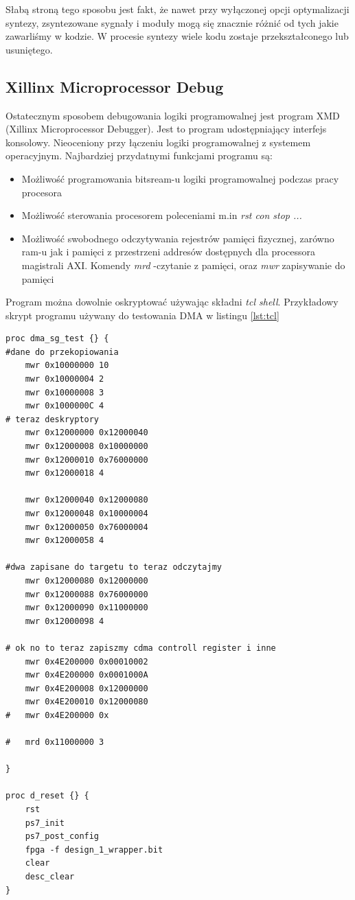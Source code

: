 Słabą stroną tego sposobu jest fakt, że nawet przy wyłączonej opcji optymalizacji
syntezy, zsyntezowane sygnały i moduły mogą się znacznie różnić od tych jakie
zawarliśmy w kodzie. W procesie syntezy wiele kodu zostaje przekształconego lub
usuniętego.

\subsection{Xillinx Microprocessor Debug}
\label{sec:logika:debug:cmd}

Ostatecznym sposobem debugowania logiki programowalnej jest program XMD
(Xillinx Microprocessor Debugger). Jest to program udostępniający interfejs
konsolowy. Nieoceniony przy łączeniu logiki programowalnej z systemem operacyjnym.
Najbardziej przydatnymi funkcjami programu są:
\begin{itemize}
\item Możliwość programowania bitsream-u logiki programowalnej podczas pracy procesora
\item Możliwość sterowania procesorem poleceniami m.in \textit{rst con stop ...}
\item Możliwość swobodnego odczytywania rejestrów pamięci fizycznej, zarówno ram-u
jak i pamięci z przestrzeni addresów dostępnych dla processora magistrali AXI.
Komendy \textit{mrd} -czytanie z pamięci, oraz \textit{mwr} zapisywanie do pamięci
\end{itemize}

Program można dowolnie oskryptować używając składni \textit{tcl shell}.
Przykładowy skrypt programu używany do testowania DMA w listingu \ref{lst:tcl}


\lstset{language=tcl}
\begin{lstlisting}[label={lst:tcl},
    caption={fragment skryptu tcl wykorzystywany do testowania DMA}]
proc dma_sg_test {} {
#dane do przekopiowania
	mwr 0x10000000 10
	mwr 0x10000004 2
	mwr 0x10000008 3
	mwr 0x1000000C 4
# teraz deskryptory
	mwr 0x12000000 0x12000040
	mwr 0x12000008 0x10000000
	mwr 0x12000010 0x76000000
	mwr 0x12000018 4

	mwr 0x12000040 0x12000080
	mwr 0x12000048 0x10000004
	mwr 0x12000050 0x76000004
	mwr 0x12000058 4

#dwa zapisane do targetu to teraz odczytajmy
	mwr 0x12000080 0x12000000
	mwr 0x12000088 0x76000000
	mwr 0x12000090 0x11000000
	mwr 0x12000098 4

# ok no to teraz zapiszmy cdma controll register i inne
	mwr 0x4E200000 0x00010002
	mwr 0x4E200000 0x0001000A
	mwr 0x4E200008 0x12000000
	mwr 0x4E200010 0x12000080
#	mwr 0x4E200000 0x

#	mrd 0x11000000 3

}

proc d_reset {} {
	rst
	ps7_init
	ps7_post_config
	fpga -f design_1_wrapper.bit
	clear
	desc_clear
}

\end{lstlisting}


